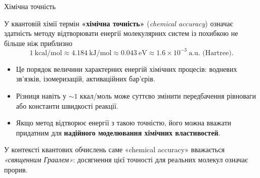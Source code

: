 \documentclass[10pt]{beamer}
\begin{document}
\begin{frame}{Хімічна точність}


\begin{block}{}
    У квантовій хімії термін \textbf{«хімічна точність»} (\textit{chemical accuracy}) означає здатність методу відтворювати енергії молекулярних систем із похибкою не більше ніж приблизно
\[
1 \ \text{kcal/mol} \approx 4.184 \ \text{kJ/mol} \approx 0.043 \ \text{eV} \approx 1.6 \times 10^{-3} \ \text{a.u. (Hartree)}.
\]
\end{block}

\begin{itemize}
  \item Це порядок величини характерних енергій хімічних процесів: водневих зв’язків, ізомеризацій, активаційних бар’єрів.
  \item Різниця навіть у $\sim 1$ ккал/моль може суттєво змінити передбачення рівноваги або константи швидкості реакції.
  \item Якщо метод відтворює енергії з такою точністю, його можна вважати придатним для \textbf{надійного моделювання хімічних властивостей}.
\end{itemize}


\begin{alertblock}{}\justifying
  У контексті квантових обчислень саме «chemical accuracy» вважається \textit{«священним Граалем»}: досягнення цієї точності для реальних молекул означає прорив.
\end{alertblock}

\end{frame}
\end{document}

